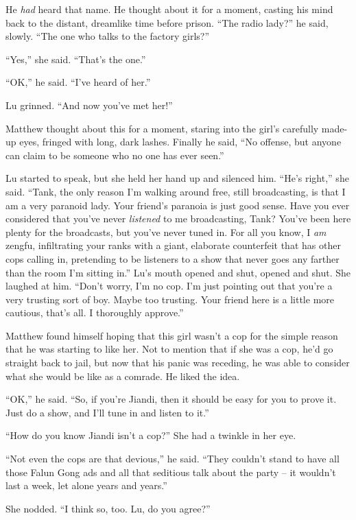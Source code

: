 He \emph{had} heard that name. He thought about it for a moment,
casting his mind back to the distant, dreamlike time before prison.
``The radio lady?'' he said, slowly. ``The one who talks to the
factory girls?''

``Yes,'' she said. ``That's the one.''

``OK,'' he said. ``I've heard of her.''

Lu grinned. ``And now you've met her!''

Matthew thought about this for a moment, staring into the girl's
carefully made-up eyes, fringed with long, dark lashes. Finally he
said, ``No offense, but anyone can claim to be someone who no one
has ever seen.''

Lu started to speak, but she held her hand up and silenced him.
``He's right,'' she said. ``Tank, the only reason I'm walking around
free, still broadcasting, is that I am a very paranoid lady. Your
friend's paranoia is just good sense. Have you ever considered that
you've never \emph{listened} to me broadcasting, Tank? You've been
here plenty for the broadcasts, but you've never tuned in. For all
you know, I \emph{am} zengfu, infiltrating your ranks with a giant,
elaborate counterfeit that has other cops calling in, pretending to
be listeners to a show that never goes any farther than the room
I'm sitting in.'' Lu's mouth opened and shut, opened and shut. She
laughed at him. ``Don't worry, I'm no cop. I'm just pointing out
that you're a very trusting sort of boy. Maybe too trusting. Your
friend here is a little more cautious, that's all. I thoroughly
approve.''

Matthew found himself hoping that this girl wasn't a cop for the
simple reason that he was starting to like her. Not to mention that
if she was a cop, he'd go straight back to jail, but now that his
panic was receding, he was able to consider what she would be like
as a comrade. He liked the idea.

``OK,'' he said. ``So, if you're Jiandi, then it should be easy for
you to prove it. Just do a show, and I'll tune in and listen to
it.''

``How do you know Jiandi isn't a cop?'' She had a twinkle in her
eye.

``Not even the cops are that devious,'' he said. ``They couldn't stand
to have all those Falun Gong ads and all that seditious talk about
the party -- it wouldn't last a week, let alone years and years.''

She nodded. ``I think so, too. Lu, do you agree?''

